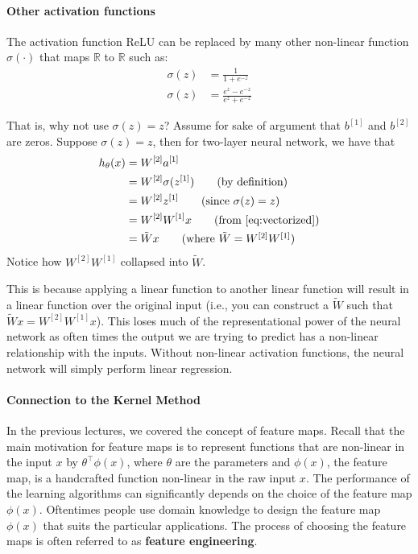 \paragraph{Other activation functions} The activation function ReLU can be replaced
by many other non-linear function $\sigma(\cdot)$ that maps $\mathbb R$ to $\mathbb R$ such as:
\begin{align}
    \sigma(z) &= \frac{1}{1 + e^{-z}} \tag{sigmoid}\\
    \sigma(z) &= \frac{e^z - e^{-z}}{e^z + e^{-z}} \tag{tanh}
\end{align}


 That is, why
not use $\sigma(z) = z$? Assume for sake of argument that $b^{[1]}$ and $b^{[2]}$ are zeros.
Suppose $\sigma(z) = z$, then for two-layer neural network, we have that
\begin{align*}
    h_\theta(x) &= W^{[2]} a^{[1]}\\
                &= W^{[2]} \sigma(z^{[1]}) \tag{by definition}\\
                &= W^{[2]} z^{[1]} \tag{since $\sigma(z)=z$}\\
                &= W^{[2]}W^{[1]} x \tag{from \cref{eq:vectorized}}\\
                &= \tilde{W} x \tag{where $\tilde{W} = W^{[2]}W^{[1]}$}
\end{align*}
Notice how $W^{[2]} W^{[1]}$ collapsed into $\tilde{W}$.

This is because applying a linear function to another linear function will
result in a linear function over the original input (i.e., you can construct a
$\tilde{W}$ such that $\tilde{W}x = W^{[2]} W^{[1]} x$). This loses much of the representational power
of the neural network as often times the output we are trying to predict
has a non-linear relationship with the inputs. Without non-linear activation
functions, the neural network will simply perform linear regression.


\paragraph{Connection to the Kernel Method} In the previous lectures, we covered
the concept of feature maps. Recall that the main motivation for feature
maps is to represent functions that are non-linear in the input $x$ by $\theta^\top \phi(x)$,
where $\theta$ are the parameters and $\phi(x)$, the feature map, is a handcrafted
function non-linear in the raw input $x$. The performance of the learning
algorithms can significantly depends on the choice of the feature map $\phi(x)$.
Oftentimes people use domain knowledge to design the feature map $\phi(x)$ that
suits the particular applications. The process of choosing the feature maps
is often referred to as \textbf{feature engineering}.

